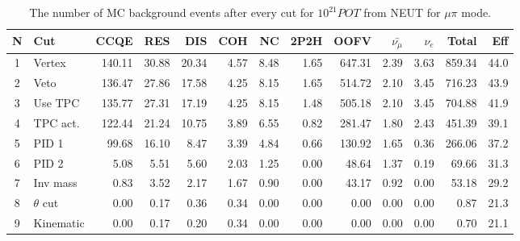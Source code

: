 \documentclass[../main.tex]{subfiles}
\begin{document}
\begin{table}[!ht]
\begin{tabular}{|c|l|r|r|r|r|r|r|r|r|r|r|r|}
  \hline
  N & Cut           &  CCQE   &  RES  &  DIS  &  COH  &  NC  &  2P2H  &  OOFV  &$\bar{\nu_{\mu}}$& $\nu_{e}$ & Total  & Eff\\
  \hline
  1 & Vertex        & 140.11  & 30.88 & 20.34 & 4.57  & 8.48 & 1.65   & 647.31 & 2.39            &  3.63     & 859.34 & 44.0 \\
  \hline
  2 & Veto          & 136.47  & 27.86 & 17.58 & 4.25  & 8.15 & 1.65   & 514.72 & 2.10            &  3.45     & 716.23 & 43.9 \\
  \hline
  3 & Use TPC       & 135.77  & 27.31 & 17.19 & 4.25  & 8.15 & 1.48   & 505.18 & 2.10            &  3.45     & 704.88 & 41.9 \\
  \hline
  4 & TPC act.      & 122.44  & 21.24 & 10.75 & 3.89  & 6.55 & 0.82   & 281.47 & 1.80            &  2.43     & 451.39 & 39.1 \\
  \hline
  5 & PID 1         & 99.68   & 16.10 & 8.47  & 3.39  & 4.84 & 0.66   & 130.92 & 1.65            &  0.36     & 266.06 & 37.2 \\
  \hline
  6 & PID 2         & 5.08    & 5.51  & 5.60  & 2.03  & 1.25 & 0.00   & 48.64  & 1.37            &  0.19     &  69.66 & 31.3 \\
  \hline
  7 & Inv mass      & 0.83    & 3.52  & 2.17  & 1.67  & 0.90 & 0.00   & 43.17  & 0.92            &  0.00     &  53.18 & 29.2  \\
  \hline
  8 & $\theta$ cut  & 0.00    & 0.17  & 0.36  & 0.34  & 0.00 & 0.00   & 0.00   & 0.00            &  0.00     &  0.87  & 21.3 \\
  \hline
  9 & Kinematic     & 0.00    & 0.17  & 0.20  & 0.34  & 0.00 & 0.00   & 0.00   & 0.00            &  0.00     &  0.70  & 21.1 \\
    \hline

\end{tabular}
\caption{The number of MC background events after every cut for $10^{21} POT$ from NEUT for $\mu\pi$ mode.}
\label{tbl:HNL:bgOrigMu}
\end{table}
\end{document}
